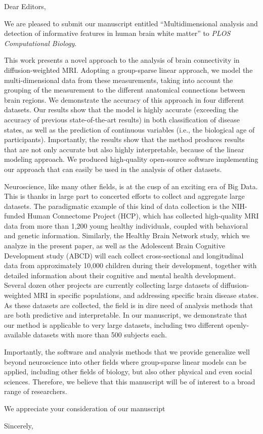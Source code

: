 \documentclass{letter}
\begin{document}
\begin{letter}{}
\opening{Dear Editors,}

We are pleased to submit our manuscript entitled ``Multidimensional analysis
and detection of informative features in human brain white matter'' to
\emph{PLOS Computational Biology}.


This work presents a novel approach to the analysis of brain connectivity in
diffusion-weighted MRI. Adopting a group-sparse linear approach, we model the
multi-dimensional data from these measurements, taking into account the
grouping of the measurement to the different anatomical connections between
brain regions. We demonstrate the accuracy of this approach in four different
datasets. Our results show that the model is highly accurate (exceeding the
accuracy of previous state-of-the-art results) in both classification of
disease states, as well as the prediction of continuous variables (i.e., the
biological age of participants). Importantly, the results show that the
method produces results that are not only accurate but also highly
interpretable, because of the linear modeling approach. We produced
high-quality open-source software implementing our approach that can easily
be used in the analysis of other datasets.

Neuroscience, like many other fields, is at the cusp of an exciting era of
Big Data. This is thanks in large part to concerted efforts to collect and
aggregate large datasets. The paradigmatic example of this kind of data
collection is the NIH-funded Human Connectome Project (HCP), which has
collected high-quality MRI data from more than 1,200 young healthy
individuals, coupled with behavioral and genetic information. Similarly, the
Healthy Brain Network study, which we analyze in the present paper, as well
as the Adolescent Brain Cognitive Development study (ABCD) will each collect
cross-sectional and longitudinal data from approximately 10,000 children
during their development, together with detailed information about their
cognitive and mental health development. Several dozen other projects are
currently collecting large datasets of diffusion-weighted MRI in specific
populations, and addressing specific brain disease states. As these datasets
are collected, the field is in dire need of analysis methods that are both
predictive and interpretable. In our manuscript, we demonstrate that our
method is applicable to very large datasets, including two different
openly-available datasets with more than 500 subjects each.

Importantly, the software and analysis methods that we provide generalize
well beyond neuroscience into other fields where group-sparse linear models
can be applied, including other fields of biology, but also other physical
and even social sciences. Therefore, we believe that this manuscript will be
of interest to a broad range of researchers.

We appreciate your consideration of our manuscript

\closing{Sincerely,}


\end{letter}
\end{document}
